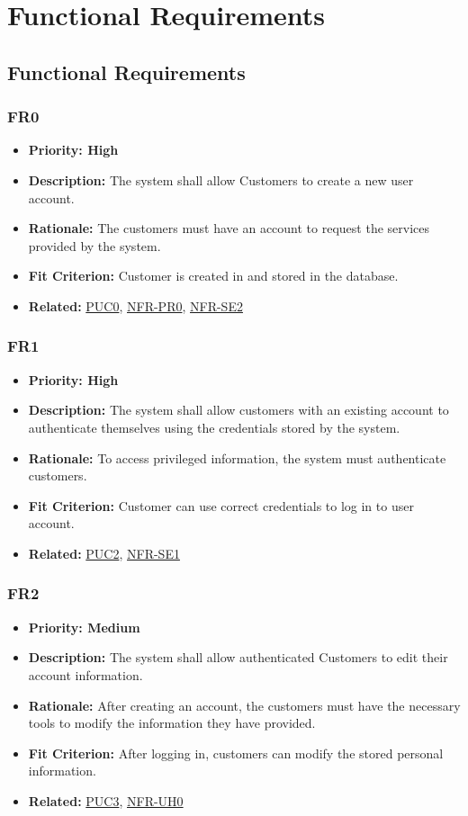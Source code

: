 \documentclass[12pt]{article}
\begin{document}
\newpage
\section{Functional Requirements}
\subsection{Functional Requirements}
\subsubsection*{FR0}
\label{sec:FR0}
\begin{itemize}
  \item \textbf{Priority: High}
  \item \textbf{Description:} The system shall allow Customers to create a new user account.
  \item \textbf{Rationale:} The customers must have an account to request the services provided by the system.
  \item \textbf{Fit Criterion:} Customer is created in and stored in the database.
  \item \textbf{Related:} \hyperref[sec:PUC0]{PUC0}, \hyperref[sec:PR0]{NFR-PR0}, \hyperref[sec:SE2]{NFR-SE2}
\end{itemize}
\subsubsection*{FR1}
\label{sec:FR1}
\begin{itemize}
  \item \textbf{Priority: High}
  \item \textbf{Description:} The system shall allow customers with an existing account to authenticate themselves using the credentials stored by the system.
  \item \textbf{Rationale:} To access privileged information, the system must authenticate customers.
  \item \textbf{Fit Criterion:} Customer can use correct credentials to log in to user account.
  \item \textbf{Related:} \hyperref[sec:PUC2]{PUC2}, \hyperref[sec:SE1]{NFR-SE1}
\end{itemize}
\subsubsection*{FR2}
\label{sec:FR2}
\begin{itemize}
  \item \textbf{Priority: Medium}
  \item \textbf{Description:} The system shall allow authenticated Customers to edit their account information.
  \item \textbf{Rationale:} After creating an account, the customers must have the necessary tools to modify the information they have provided.
  \item \textbf{Fit Criterion:} After logging in, customers can modify the stored personal information.
  \item \textbf{Related:} \hyperref[sec:PUC3]{PUC3}, \hyperref[sec:UH0]{NFR-UH0}
\end{itemize}
\end{document}
